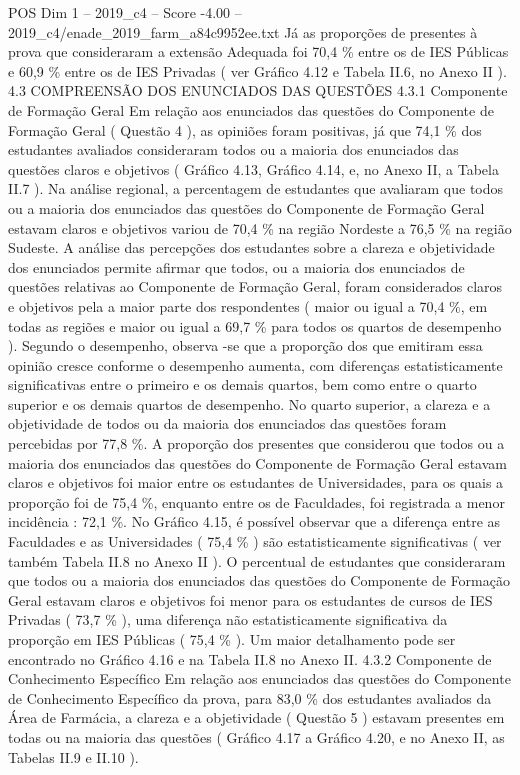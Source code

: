 \begin{textsample}{POS Dim 1 – 2019\_c4 – Score -4.00 – 2019\_c4/enade\_2019\_farm\_a84c9952ee.txt}
Já as proporções de presentes à prova que consideraram a extensão Adequada foi 70,4 \% entre os de IES Públicas e 60,9 \% entre os de IES Privadas ( ver Gráfico 4.12 e Tabela II.6, no Anexo II ). 4.3 COMPREENSÃO DOS ENUNCIADOS DAS QUESTÕES 4.3.1 Componente de Formação Geral Em relação aos enunciados das questões do Componente de Formação Geral ( Questão 4 ), as opiniões foram positivas, já que 74,1 \% dos estudantes avaliados consideraram todos ou a maioria dos enunciados das questões claros e objetivos ( Gráfico 4.13, Gráfico 4.14, e, no Anexo II, a Tabela II.7 ).
Na análise regional, a percentagem de estudantes que avaliaram que todos ou a maioria dos enunciados das questões do Componente de Formação Geral estavam claros e objetivos variou de 70,4 \% na região Nordeste a 76,5 \% na região Sudeste.
A análise das percepções dos estudantes sobre a clareza e objetividade dos enunciados permite afirmar que todos, ou a maioria dos enunciados de questões relativas ao Componente de Formação Geral, foram considerados claros e objetivos pela a maior parte dos respondentes ( maior ou igual a 70,4 \%, em todas as regiões e maior ou igual a 69,7 \% para todos os quartos de desempenho ).
Segundo o desempenho, observa -se que a proporção dos que emitiram essa opinião cresce conforme o desempenho aumenta, com diferenças estatisticamente significativas entre o primeiro e os demais quartos, bem como entre o quarto superior e os demais quartos de desempenho.
No quarto superior, a clareza e a objetividade de todos ou da maioria dos enunciados das questões foram percebidas por 77,8 \%.
A proporção dos presentes que considerou que todos ou a maioria dos enunciados das questões do Componente de Formação Geral estavam claros e objetivos foi maior entre os estudantes de Universidades, para os quais a proporção foi de 75,4 \%, enquanto entre os de Faculdades, foi registrada a menor incidência : 72,1 \%.
No Gráfico 4.15, é possível observar que a diferença entre as Faculdades e as Universidades ( 75,4 \% ) são estatisticamente significativas ( ver também Tabela II.8 no Anexo II ).
O percentual de estudantes que consideraram que todos ou a maioria dos enunciados das questões do Componente de Formação Geral estavam claros e objetivos foi menor para os estudantes de cursos de IES Privadas ( 73,7 \% ), uma diferença não estatisticamente significativa da proporção em IES Públicas ( 75,4 \% ).
Um maior detalhamento pode ser encontrado no Gráfico 4.16 e na Tabela II.8 no Anexo II. 4.3.2 Componente de Conhecimento Específico Em relação aos enunciados das questões do Componente de Conhecimento Específico da prova, para 83,0 \% dos estudantes avaliados da Área de Farmácia, a clareza e a objetividade ( Questão 5 ) estavam presentes em todas ou na maioria das questões ( Gráfico 4.17 a Gráfico 4.20, e no Anexo II, as Tabelas II.9 e II.10 ).

\end{textsample}
